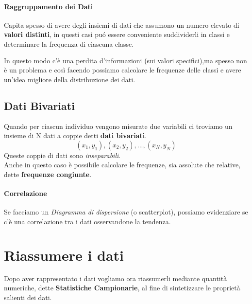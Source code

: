 \paragraph{Raggruppamento dei Dati}
Capita spesso di avere degli insiemi di dati che assumono un numero elevato di \textbf{valori distinti}, 
in questi casi puó essere conveniente suddividerli in classi e determinare la frequenza di ciascuna classe.

In questo modo c'è una perdita d'informazioni (sui valori specifici),ma spesso non è un problema e così facendo possiamo
calcolare le frequenze delle classi e avere un'idea migliore della distribuzione dei dati.

\subsection*{Dati Bivariati}
Quando per ciascun individuo vengono misurate due variabili ci troviamo un insieme di N dati a coppie detti \textbf{dati bivariati}.
$$(x_1,y_1), (x_2,y_2), ..., (x_N, y_N)$$
Queste coppie di dati sono \emph{inseparabili}.\\
Anche in questo caso è possibile calcolare le frequenze, sia assolute che relative, dette \textbf{frequenze congiunte}.

\paragraph{Correlazione}
Se facciamo un \emph{Diagramma di dispersione} (o scatterplot), possiamo evidenziare se c'è una correlazione tra i dati osservandone la tendenza.

\section{Riassumere i dati}
Dopo aver rappresentato i dati vogliamo ora riassumerli mediante quantità numeriche, dette \textbf{Statistiche Campionarie}, al fine di sintetizzare le proprietà
salienti dei dati.


